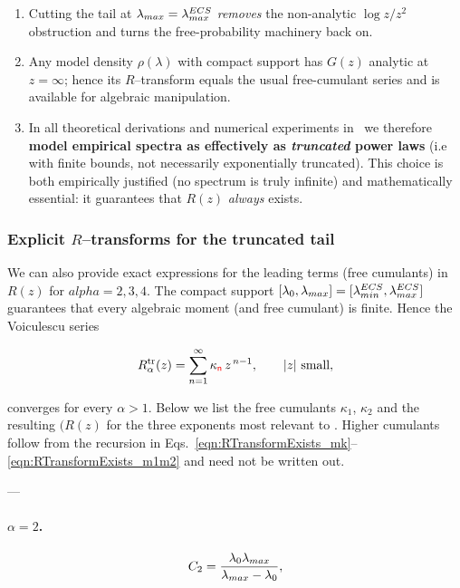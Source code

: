 \begin{enumerate}
\item Cutting the tail at $\lambda_{max}=\lambda^{ECS}_{max}$ \emph{removes} the non-analytic
  $\log z/z^{2}$ obstruction and turns the free-probability machinery back
  on.
\item Any model density $\rho(\lambda)$ with compact support has $G(z)$ analytic at
  $z=\infty$; hence its $R$–transform equals the usual free-cumulant
  series and is available for algebraic manipulation.
\item In all theoretical derivations and numerical experiments in
  \SETOL\ we therefore \textbf{model empirical spectra as effectively as \emph{truncated}
  power laws} (i.e with finite bounds, not necessarily exponentially truncated).
  This choice is both empirically justified (no spectrum is truly
  infinite) and mathematically essential: it guarantees that $R(z)$
  \emph{always} exists.
\end{enumerate}


\subsubsection{Explicit \texorpdfstring{$R$}{R}–transforms for the truncated tail}
\label{sxn:RTransformExists:explicit}

We can also provide exact expressions for the leading terms (free cumulants) in $R(z)$ for $alpha=2,3,4$.
The compact support $[\lambda_{0},\lambda_{max}]=[\lambda^{ECS}_{min},\lambda^{ECS}_{max}]$ guarantees that every
algebraic moment (and free cumulant) is finite. Hence the Voiculescu series 

\begin{equation}
R_{\alpha}^{\mathrm{tr}}(z)=
\sum_{n=1}^{\infty}\kappa{_{\color{red}\sf{n}}}\,z^{\,n-1},
\qquad |z|\text{ small},
\end{equation}

\noindent converges for every $\alpha>1$.  
Below we list the free cumulants $\kappa_{1}$, $\kappa_{2}$ and the resulting
$(R(z)$ for the three exponents most relevant to \SETOL.
Higher cumulants follow from the recursion in
Eqs.~\eqref{eqn:RTransformExists_mk}–\eqref{eqn:RTransformExists_m1m2} and
need not be written out.

---

\paragraph{$\alpha = 2$.}

\begin{equation}
C_{2}=\frac{\lambda_{0}\lambda_{max}}{\lambda_{max}-\lambda_{0}},
\end{equation}

